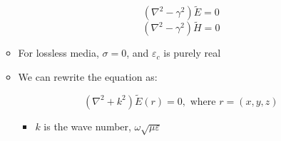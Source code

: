 \begin{itemize}
\begin{itemize}
        $$(\nabla^2-\gamma^2)\tilde{E}=0$$
        $$(\nabla^2-\gamma^2)\tilde{H}=0$$

      \item For lossless media, $\sigma=0$, and $\varepsilon_c$ is purely real

      \item We can rewrite the equation as:

        $$(\nabla^2+k^2)\tilde{E}(r)=0,\text{ where }r=(x,y,z)$$

        \begin{itemize}

          \item $k$ is the wave number, $\omega\sqrt{\mu\varepsilon}$

        \end{itemize}

    \end{itemize}

\end{itemize}



